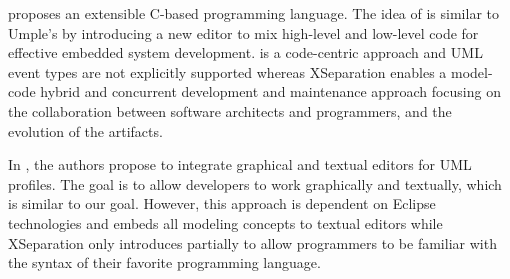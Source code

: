  \cite{voelter2012mbeddr} proposes an extensible C-based programming language.
The idea of  is similar to Umple's by introducing a new editor to mix high-level and low-level code for effective embedded system development. 
 is a code-centric approach and UML event types are not explicitly supported whereas XSeparation enables a model-code hybrid and concurrent development and maintenance approach focusing on the collaboration between software architects and programmers, and the evolution of the artifacts.  


In \cite{Maro:2015:IGT:2814251.2814253}, the authors propose to integrate graphical and textual editors for UML profiles.
The goal is to allow developers to work graphically and textually, which is similar to our goal.
However, this approach is dependent on Eclipse technologies and embeds all modeling concepts to textual editors while XSeparation only introduces partially to allow programmers to be familiar with the syntax of their favorite programming language.


%
